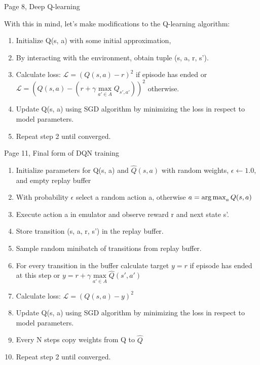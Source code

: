 Page 8, Deep Q-learning

With this in mind, let's make modifications to the Q-learning algorithm:
\begin{enumerate}
  \item Initialize Q(s, a) with some initial approximation,
  \item By interacting with the environment, obtain tuple (s, a, r, s').
  \item Calculate loss:
    \begin{math}\mathcal{L} = (Q(s,a) - r)^2\end{math} if episode has ended or
      \begin{math}\mathcal{L} = (Q(s,a) - (r + \gamma \max\limits_{a' \in
          A}Q_{s',a'}))^2\end{math} otherwise.
  \item Update Q(s, a) using SGD algorithm by minimizing the loss in respect to model parameters.
  \item Repeat step 2 until converged.
\end{enumerate}

Page 11, Final form of DQN training
\begin{enumerate}
  \item Initialize parameters for Q(s, a) and \begin{math}\hat{Q}(s, a)\end{math} with random
    weights, \begin{math}\epsilon \leftarrow 1.0\end{math}, and empty replay buffer
  \item With probability \begin{math}\epsilon\end{math} select a random action a, otherwise
    \begin{math}a = \operatorname*{arg\,max}_aQ(s, a)\end{math}
  \item Execute action a in emulator and observe reward r and next state s'.
  \item Store transition (s, a, r, s') in the replay buffer.
  \item Sample random minibatch of transitions from replay buffer.
  \item For every transition in the buffer calculate target \begin{math}y = r\end{math}
    if episode has ended at this step or
    \begin{math}y = r + \gamma \max\limits_{a' \in A} \hat{Q}(s',a')\end{math}
  \item Calculate loss: \begin{math}\mathcal{L} = (Q(s, a) - y)^2\end{math}
  \item Update Q(s, a) using SGD algorithm by minimizing the loss in respect to model parameters.
  \item Every N steps copy weights from Q to \begin{math}\hat{Q}\end{math}
  \item Repeat step 2 until converged.
\end{enumerate}



